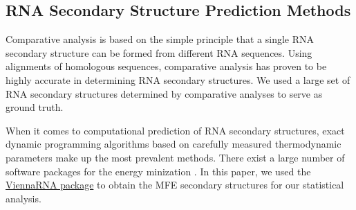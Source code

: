 \documentclass[10pt,letterpaper]{article}
\begin{document}
\subsection*{RNA Secondary Structure Prediction Methods}
Comparative analysis\cite{Gutell1992-hu} is based on the simple principle that a single RNA secondary structure can be formed from different RNA sequences. Using alignments of homologous sequences, comparative analysis has proven to be highly accurate in determining RNA secondary structures\cite{Gutell2002-ei}. We used a large set of RNA secondary structures determined by comparative analyses to serve as ground truth.

When it comes to computational prediction of RNA secondary structures, exact dynamic programming algorithms based on carefully measured thermodynamic parameters make up the most prevalent methods. There exist a large number of software packages for the energy minization \cite{Lorenz2011-eb, Markham2008-ku, Reuter2010-bw, Zadeh2011-eu, Hamada2009-yf, Ding2003-sv, Reeder2009-xl}. In this paper, we used the \href{https://www.tbi.univie.ac.at/RNA/}{ViennaRNA package} \cite{Lorenz2011-eb} to obtain the MFE secondary structures for our statistical analysis.
\end{document}
